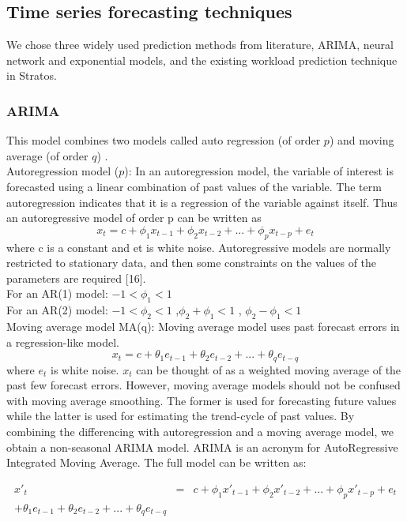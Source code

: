 \subsection{Time series forecasting techniques}
We chose three widely used prediction methods from literature, ARIMA, neural network and exponential models, and the existing workload prediction technique in Stratos.

\subsubsection{ARIMA}
This model combines two models called auto regression (of order $p$) and moving average (of order $q$) .\\

Autoregression model ($p$): 
In an autoregression model, the variable of interest is forecasted using a linear combination of past values of the variable. The term autoregression indicates that it is a regression of the variable against itself. Thus an autoregressive model of order p can be written as
	$$x_t = c + \phi_1x_{ t-1} + \phi_2x_{t-2} +...+ \phi_px_{t-p} + e_{t}$$
where c is a constant and et is white noise. Autoregressive models are normally restricted to stationary data, and then some constraints on the values of the parameters are required [16]. \\
For an AR(1) model: $-1 < \phi_{1} < 1$ \\
For an AR(2) model: $-1 < \phi_{2} < 1$ ,$\phi_{2}+ \phi_{1} < 1$ , $\phi_{2} - \phi_{1} < 1$ \\
Moving average model MA(q):  
Moving average model uses past forecast errors in a regression-like model.
	$$x_t =  c + \theta_1e_{ t-1} + \theta_2e_{t-2} +...+ \theta_qe_{t-q}$$
where $e_t$ is white noise. $x_t$ can be thought of as a weighted moving average of the past few forecast errors. However, moving average models should not be confused with moving average smoothing. The former is used for forecasting future values while the latter is used for estimating the trend-cycle of past values.
By combining the differencing with autoregression and a moving average model, we obtain a non-seasonal ARIMA model. ARIMA is an acronym for AutoRegressive Integrated Moving Average. The full model can be written as:

    \begin{eqnarray}\nonumber
	 {x}'_t &=& c + \phi_1{x}'_{ t-1} + \phi_2{x}'_{t-2} +...+ \phi_p{x}'_{t-p} + e_{t}  \\
     + \theta_1e_{ t-1} + \theta_2e_{t-2} +...+ \theta_qe_{t-q} \\
	\end{eqnarray}
	
